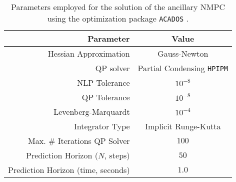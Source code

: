 \begin{table}
\caption{Parameters employed for the solution of the ancillary \ac{NMPC} using the optimization package \texttt{ACADOS} \cite{Verschueren2021}.}
\vspace*{-0.1in}
\begin{center}
\begin{tabular}{ r c }
Parameter & Value \\
\hline 
\hline 
Hessian Approximation  & Gauss-Newton \\
QP solver & Partial Condensing \texttt{HPIPM} \cite{frison2020hpipm} \\
NLP Tolerance &  $10^{-8}$ \\
QP  Tolerance & $10^{-8}$ \\
Levenberg-Marquardt & $10^{-4}$\\
Integrator Type & Implicit Runge-Kutta  \\
Max. \# Iterations QP Solver & $100$ \\
Prediction Horizon ($N$, steps) & $50$ \\
Prediction Horizon (time, seconds) & $1.0$ \\
\end{tabular}
\label{tab:acados_parameters}
\end{center}
\end{table}